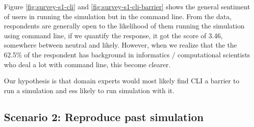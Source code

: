 \vspace{1cm}

Figure \ref{fig:survey-s1-cli} and \ref{fig:survey-s1-cli-barrier} shows the general sentiment of users in running the simulation but in the command line. From the data, respondents are generally open to the likelihood of them running the simulation using command line, if we quantify the response, it got the score of 3.46, somewhere between neutral and likely. However, when we realize that the the 62.5\% of the respondent has background in informatics / computational scientists who deal a lot with command line, this become clearer.

Our hypothesis is that domain experts would most likely find CLI a barrier to run a simulation and ess likely to run simulation with it.



\subsection{Scenario 2: Reproduce past simulation}

\vspace{1cm}

\noindent%
\begin{minipage}{\linewidth}%
 \label{fig:survey-s2-usability}%
\end{minipage}

\vspace{1cm}


